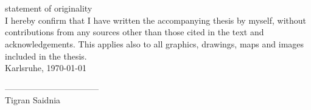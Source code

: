 \chapter*{}
\begin{flushleft}
\vspace{11cm}
 statement of originality\\[1cm]
I hereby confirm that I have written the accompanying thesis by myself, without contributions from any sources other than those cited in the text and acknowledgements. This applies also to all graphics, drawings, maps and images included in the thesis.\\[1cm]

Karlsruhe, \today \\[1cm]
\end{flushleft}

\begin{center}
---------------------------------\\
Tigran Saidnia
\end{center}

